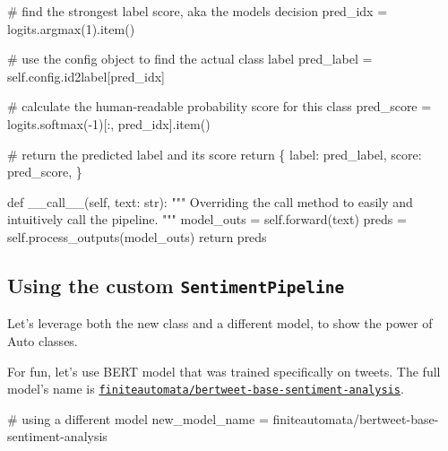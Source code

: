 \documentclass[
  letterpaper,
  DIV=11,
  numbers=noendperiod]{scrartcl}
\newenvironment{Shaded}{\begin{snugshade}}{\end{snugshade}}
\newcommand{\BuiltInTok}[1]{\textcolor[rgb]{0.00,0.23,0.31}{#1}}
\newcommand{\CommentTok}[1]{\textcolor[rgb]{0.37,0.37,0.37}{#1}}
\newcommand{\ControlFlowTok}[1]{\textcolor[rgb]{0.00,0.23,0.31}{#1}}
\newcommand{\DecValTok}[1]{\textcolor[rgb]{0.68,0.00,0.00}{#1}}
\newcommand{\FunctionTok}[1]{\textcolor[rgb]{0.28,0.35,0.67}{#1}}
\newcommand{\KeywordTok}[1]{\textcolor[rgb]{0.00,0.23,0.31}{#1}}
\newcommand{\NormalTok}[1]{\textcolor[rgb]{0.00,0.23,0.31}{#1}}
\newcommand{\OperatorTok}[1]{\textcolor[rgb]{0.37,0.37,0.37}{#1}}
\newcommand{\StringTok}[1]{\textcolor[rgb]{0.13,0.47,0.30}{#1}}
\newcommand{\VariableTok}[1]{\textcolor[rgb]{0.07,0.07,0.07}{#1}}
\begin{document}
\begin{Shaded}
\begin{Highlighting}[]
        \CommentTok{\# find the strongest label score, aka the model\textquotesingle{}s decision}
\NormalTok{        pred\_idx }\OperatorTok{=}\NormalTok{ logits.argmax(}\DecValTok{1}\NormalTok{).item()}

        \CommentTok{\# use the \textasciigrave{}config\textasciigrave{} object to find the actual class label}
\NormalTok{        pred\_label }\OperatorTok{=} \VariableTok{self}\NormalTok{.config.id2label[pred\_idx]  }

        \CommentTok{\# calculate the human{-}readable probability score for this class}
\NormalTok{        pred\_score }\OperatorTok{=}\NormalTok{ logits.softmax(}\OperatorTok{{-}}\DecValTok{1}\NormalTok{)[:, pred\_idx].item()}

        \CommentTok{\# return the predicted label and its score}
        \ControlFlowTok{return}\NormalTok{ \{}
            \StringTok{\textquotesingle{}label\textquotesingle{}}\NormalTok{: pred\_label,}
            \StringTok{\textquotesingle{}score\textquotesingle{}}\NormalTok{: pred\_score, }
\NormalTok{        \}}
    
    \KeywordTok{def} \FunctionTok{\_\_call\_\_}\NormalTok{(}\VariableTok{self}\NormalTok{, text: }\BuiltInTok{str}\NormalTok{):}
        \CommentTok{"""}
\CommentTok{        Overriding the call method to easily and intuitively call the pipeline.}
\CommentTok{        """}
\NormalTok{        model\_outs }\OperatorTok{=} \VariableTok{self}\NormalTok{.forward(text)}
\NormalTok{        preds }\OperatorTok{=} \VariableTok{self}\NormalTok{.process\_outputs(model\_outs)}
        \ControlFlowTok{return}\NormalTok{ preds}
\end{Highlighting}
\end{Shaded}

\subsection{\texorpdfstring{Using the custom
\texttt{SentimentPipeline}}{Using the custom SentimentPipeline}}\label{using-the-custom-sentimentpipeline}

Let's leverage both the new class and a different model, to show the
power of Auto classes.

For fun, let's use BERT model that was trained specifically on tweets.
The full model's name is
\href{https://huggingface.co/finiteautomata/bertweet-base-sentiment-analysis}{\texttt{finiteautomata/bertweet-base-sentiment-analysis}}.

\begin{Shaded}
\begin{Highlighting}[]
\CommentTok{\# using a different model}
\NormalTok{new\_model\_name }\OperatorTok{=} \StringTok{\textquotesingle{}finiteautomata/bertweet{-}base{-}sentiment{-}analysis\textquotesingle{}}
\end{Highlighting}
\end{Shaded}
\end{document}
